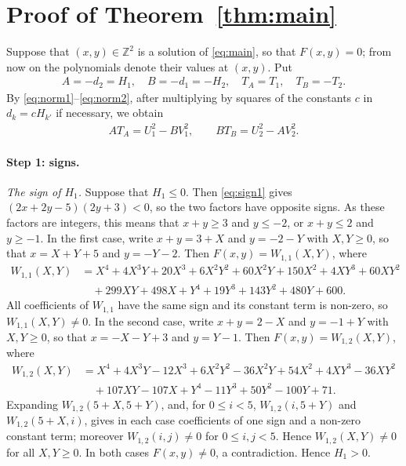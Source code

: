 \documentclass[11pt]{article}
\newcommand{\Z}{\mathbb{Z}}
\begin{document}
\section{Proof of Theorem~\ref{thm:main}}

Suppose that $(x,y)\in\Z^2$ is a solution of \eqref{eq:main}, so that $F(x,y)=0$; from now on the polynomials denote their values at $(x,y)$. Put
\begin{gather*}
A=-d_{2}=H_{1},\quad B=-d_{1}=-H_{2},\quad T_A=T_{1},\quad T_B=-T_{2}.
\end{gather*}
By \eqref{eq:norm1}--\eqref{eq:norm2}, after multiplying by squares of the constants $c$ in $d_k=cH_{k'}$ if necessary, we obtain
\begin{align}
AT_A=U_{1}^2-BV_{1}^2,\qquad BT_B=U_{2}^2-AV_{2}^2.\label{eq:AB}
\end{align}

\paragraph{Step 1: signs.} \emph{The sign of $H_{1}$.} Suppose that $H_{1}\leq0$. Then \eqref{eq:sign1} gives $(2x+2y-5)(2y+3)<0$, so the two factors have opposite signs. As these factors are integers, this means that $x+y\geq3$ and $y\leq-2$, or $x+y\leq2$ and $y\geq-1$. In the first case, write $x+y=3+X$ and $y=-2-Y$ with $X,Y\geq0$, so that $x=X+Y+5$ and $y=-Y-2$. Then $F(x,y)=W_{1,1}(X,Y)$, where
\begin{align*}
W_{1,1}(X,Y)&=X^{4}+4X^{3}Y+20X^{3}+6X^{2}Y^{2}+60X^{2}Y+150X^{2}+4XY^{3}+60XY^{2}\\
&\quad+299XY+498X+Y^{4}+19Y^{3}+143Y^{2}+480Y+600.
\end{align*}
All coefficients of $W_{1,1}$ have the same sign and its constant term is non-zero, so $W_{1,1}(X,Y)\neq0$. In the second case, write $x+y=2-X$ and $y=-1+Y$ with $X,Y\geq0$, so that $x=-X-Y+3$ and $y=Y-1$. Then $F(x,y)=W_{1,2}(X,Y)$, where
\begin{align*}
W_{1,2}(X,Y)&=X^{4}+4X^{3}Y-12X^{3}+6X^{2}Y^{2}-36X^{2}Y+54X^{2}+4XY^{3}-36XY^{2}\\
&\quad+107XY-107X+Y^{4}-11Y^{3}+50Y^{2}-100Y+71.
\end{align*}
Expanding $W_{1,2}(5+X,5+Y)$, and, for $0\leq i<5$, $W_{1,2}(i,5+Y)$ and $W_{1,2}(5+X,i)$, gives in each case coefficients of one sign and a non-zero constant term; moreover $W_{1,2}(i,j)\neq0$ for $0\leq i,j<5$. Hence $W_{1,2}(X,Y)\neq0$ for all $X,Y\geq0$. In both cases $F(x,y)\neq0$, a contradiction. Hence $H_{1}>0$.
\end{document}
